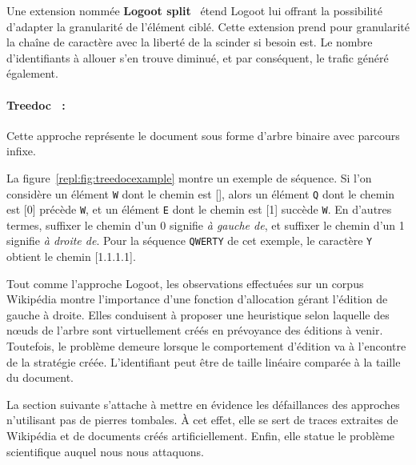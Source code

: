 \noindent Une extension nommée \textbf{Logoot split}~\cite{andre2013supporting}
étend Logoot lui offrant la possibilité d'adapter la granularité de l'élément
ciblé.  Cette extension prend pour granularité la chaîne de caractère avec la
liberté de la scinder si besoin est. Le nombre d'identifiants à allouer s'en
trouve diminué, et par conséquent, le trafic généré également.

\paragraph{Treedoc~\cite{letia2009crdts, preguica2009commutative} :} Cette
approche représente le document sous forme d'arbre binaire avec parcours infixe.
  
\begin{figure*}
  \begin{center}
    
    \caption[Chemins alloués par Treedoc]
    {\label{repl:fig:treedocexample}Exemple de séquence dont les chemins sont
      alloués grâce à Treedoc.}
  \end{center}
\end{figure*}

\noindent La figure~\ref{repl:fig:treedocexample} montre un exemple de
séquence. Si l'on considère un élément \texttt{W} dont le chemin est [], alors
un élément \texttt{Q} dont le chemin est [0] précède \texttt{W}, et un élément
\texttt{E} dont le chemin est [1] succède \texttt{W}. En d'autres termes,
suffixer le chemin d'un 0 signifie \emph{à gauche de}, et suffixer le chemin
d'un 1 signifie \emph{à droite de}. Pour la séquence \texttt{QWERTY} de cet
exemple, le caractère \texttt{Y} obtient le chemin [1.1.1.1].
  
\noindent Tout comme l'approche Logoot, les observations effectuées sur un
corpus Wikipédia montre l'importance d'une fonction d'allocation gérant
l'édition de gauche à droite. Elles conduisent à proposer une heuristique selon
laquelle des nœuds de l'arbre sont virtuellement créés en prévoyance des
éditions à venir. Toutefois, le problème demeure lorsque le comportement
d'édition va à l'encontre de la stratégie créée. L'identifiant peut être de
taille linéaire comparée à la taille du document.


La section suivante s'attache à mettre en évidence les défaillances des
approches n'utilisant pas de pierres tombales. À cet effet, elle se sert de
traces extraites de Wikipédia et de documents créés artificiellement. Enfin,
elle statue le problème scientifique auquel nous nous attaquons.

